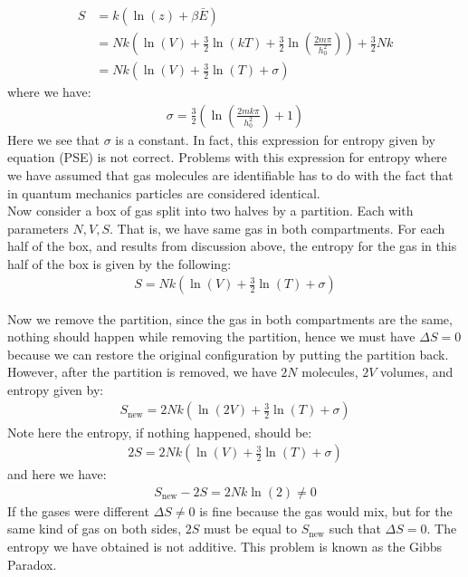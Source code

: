 \documentclass[11pt,oneside]{book}
\theoremstyle{break}
\theoremstyle{break}
\begin{document}
\begin{align*}
S 
&= k\left( \ln(z) +\beta \bar{E}\right) \\
&= Nk\left( \ln(V) + \frac{3}{2}\ln\left(kT\right) + \frac{3}{2}\ln\left(\frac{2m\pi}{h_0^2}\right)\right) + \frac{3}{2}Nk\\
&= Nk\left(\ln(V) + \frac{3}{2}\ln(T)+ \sigma\right) \tag{PSE}
\end{align*}
where we have:
\begin{align*}
\sigma = \frac{3}{2}\left( \ln\left( \frac{2mk\pi}{h_0^2}\right) + 1\right)
\end{align*}
Here we see that $\sigma$ is a constant. In fact, this expression for entropy given by equation (PSE) is not correct. Problems with this expression for entropy where we have assumed that gas molecules are identifiable has to do with the fact that in quantum mechanics particles are considered identical.\\

\hfill\break
\hfill\break
Now consider a box of gas split into two halves by a partition. Each with parameters $N,V,S$. That is, we have same gas in both compartments. For each half of the box, and results from discussion above, the entropy for the gas in this half of the box is given by the following:
\begin{align*}
S = Nk\left(\ln(V) + \frac{3}{2}\ln(T) + \sigma\right)
\end{align*}

Now we remove the partition, since the gas in both compartments are the same, nothing should happen while removing the partition, hence we must have $\Delta S = 0$ because we can restore the original configuration by putting the partition back. However, after the partition is removed, we have $2N$ molecules, $2V$ volumes, and entropy given by:
\begin{align*}
S_{\text{new}} = 2Nk\left( \ln(2V)+ \frac{3}{2}\ln(T) + \sigma\right)
\end{align*} 
Note here the entropy, if nothing happened, should be:
\begin{align*}
2S = 2Nk\left( \ln(V) + \frac{3}{2}\ln(T) + \sigma\right)
\end{align*}
and here we have: 
\begin{align*}
S_{\text{new}} - 2S = 2Nk\ln(2) \neq 0
\end{align*}
If the gases were different $\Delta S \neq 0$ is fine because the gas would mix, but for the same kind of gas on both sides, $2S$ must be equal to $S_{\text{new}}$ such that $\Delta S = 0$. The entropy we have obtained is not additive. This problem is known as the Gibbs Paradox.\\
\end{document}
